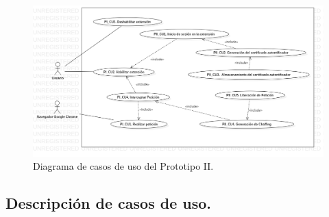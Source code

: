 \documentclass[12pt, a4paper, titlepage]{report}
\begin{document}
    			    \begin{figure}[H]
			            \begin{center}			                \includegraphics[width=16cm]{./imagenes/Desarrollo/Prototipo_2/UCD_P2.png}
    						\caption{Diagrama de casos de uso del Prototipo II.}
                        \end{center}    					
    				\end{figure}
			    
	        \subsection{Descripción de casos de uso.}
			    
\end{document}
